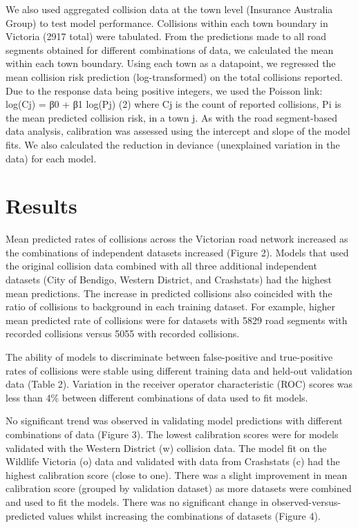 We also used aggregated collision data at the town level (Insurance Australia Group) to test model performance. Collisions within each town boundary in Victoria (2917 total) were tabulated. From the predictions made to all road segments obtained for different combinations of data, we calculated the mean within each town boundary. Using each town as a datapoint, we regressed the mean collision risk prediction (log-transformed) on the total collisions reported. Due to the response data being positive integers, we used the Poisson link:
log(Cj) = β0 + β1 log(Pj)					(2)
where Cj is the count of reported collisions, Pi is the mean predicted collision risk, in a town j. As with the road segment-based data analysis, calibration was assessed using the intercept and slope of the model fits. We also calculated the reduction in deviance (unexplained variation in the data) for each model.

\section{Results}

Mean predicted rates of collisions across the Victorian road network increased as the combinations of independent datasets increased (Figure 2). Models that used the original collision data combined with all three additional independent datasets (City of Bendigo, Western District, and Crashstats) had the highest mean predictions. The increase in predicted collisions also coincided with the ratio of collisions to background in each training dataset. For example, higher mean predicted rate of collisions were for datasets with 5829 road segments with recorded collisions versus 5055 with recorded collisions.

The ability of models to discriminate between false-positive and true-positive rates of collisions were stable using different training data and held-out validation data (Table 2). Variation in the receiver operator characteristic (ROC) scores was less than 4\% between different combinations of data used to fit models.

No significant trend was observed in validating model predictions with different combinations of data (Figure 3). The lowest calibration scores were for models validated with the Western District (w) collision data. The model fit on the Wildlife Victoria (o) data and validated with data from Crashstats (c) had the highest calibration score (close to one). There was a slight improvement in mean calibration score (grouped by validation dataset) as more datasets were combined and used to fit the models. There was no significant change in observed-versus-predicted values whilst increasing the combinations of datasets (Figure 4).


